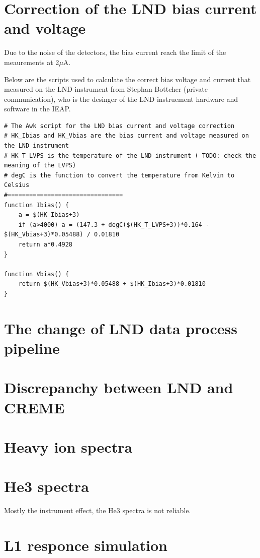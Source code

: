 \section{Correction of the LND bias current and voltage}

Due to the noise of the detectors, the bias current reach the limit of the meaurements at 2$\mu$A. 

Below are the scripts used to calculate the correct bias voltage and current that measured on the LND instrument from Stephan B\¨ottcher (private communication), who is the desinger of the LND instruement hardware and software in the IEAP.
\begin{lstlisting}
# The Awk script for the LND bias current and voltage correction
# HK_Ibias and HK_Vbias are the bias current and voltage measured on the LND instrument
# HK_T_LVPS is the temperature of the LND instrument ( TODO: check the meaning of the LVPS)
# degC is the function to convert the temperature from Kelvin to Celsius
#================================
function Ibias() {
    a = $(HK_Ibias+3)
    if (a>4000) a = (147.3 + degC($(HK_T_LVPS+3))*0.164 - $(HK_Vbias+3)*0.05488) / 0.01810
    return a*0.4928
}

function Vbias() {
    return $(HK_Vbias+3)*0.05488 + $(HK_Ibias+3)*0.01810
}

\end{lstlisting}



\section{The change of LND data process pipeline}
\label{chp:appendix_LND_data_process_pipeline}

\section{Discrepanchy between LND and CREME}

\section{Heavy ion spectra}

\section{He3 spectra}
\label{chp:appendix_LND_He3_spectra}
Mostly the instrument effect, the He3 spectra is not reliable.

\section{L1 responce simulation}

